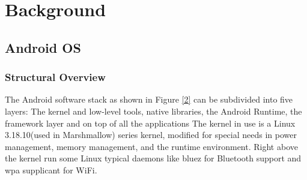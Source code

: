 \documentclass[12pt]{report}
\begin{document}
\chapter{Background}
\section{Android OS}
\subsection{Structural Overview}
The Android software stack as shown in Figure \ref{2} can be subdivided into five
layers: The kernel and low-level tools, native libraries, the Android Runtime, the
framework layer and on top of all the applications
The kernel in use is a Linux 3.18.10(used in Marshmallow) series kernel, modified for special needs in
power management, memory management, and the runtime environment.  Right above the kernel run some Linux typical daemons like bluez for Bluetooth support
and wpa supplicant for WiFi.
\end{document}
